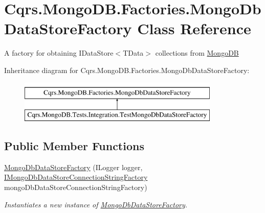\hypertarget{classCqrs_1_1MongoDB_1_1Factories_1_1MongoDbDataStoreFactory}{}\section{Cqrs.\+Mongo\+D\+B.\+Factories.\+Mongo\+Db\+Data\+Store\+Factory Class Reference}
\label{classCqrs_1_1MongoDB_1_1Factories_1_1MongoDbDataStoreFactory}


A factory for obtaining I\+Data\+Store$<$\+T\+Data$>$ collections from \hyperlink{namespaceCqrs_1_1MongoDB}{Mongo\+DB}  


Inheritance diagram for Cqrs.\+Mongo\+D\+B.\+Factories.\+Mongo\+Db\+Data\+Store\+Factory\+:\begin{figure}[H]
\begin{center}
\leavevmode
\includegraphics[height=2.000000cm]{classCqrs_1_1MongoDB_1_1Factories_1_1MongoDbDataStoreFactory}
\end{center}
\end{figure}
\subsection*{Public Member Functions}
\begin{DoxyCompactItemize}
\item 
\hyperlink{classCqrs_1_1MongoDB_1_1Factories_1_1MongoDbDataStoreFactory_a5306704647ba6dab35844231ca999b7e_a5306704647ba6dab35844231ca999b7e}{Mongo\+Db\+Data\+Store\+Factory} (I\+Logger logger, \hyperlink{interfaceCqrs_1_1MongoDB_1_1Factories_1_1IMongoDbDataStoreConnectionStringFactory}{I\+Mongo\+Db\+Data\+Store\+Connection\+String\+Factory} mongo\+Db\+Data\+Store\+Connection\+String\+Factory)
\begin{DoxyCompactList}\small\item\em Instantiates a new instance of \hyperlink{classCqrs_1_1MongoDB_1_1Factories_1_1MongoDbDataStoreFactory}{Mongo\+Db\+Data\+Store\+Factory}. \end{DoxyCompactList}\end{DoxyCompactItemize}
